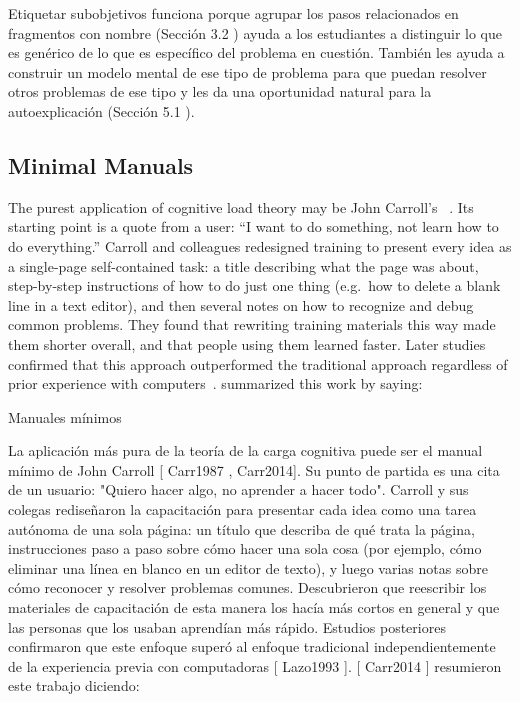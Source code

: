 Etiquetar subobjetivos funciona porque agrupar los pasos relacionados en fragmentos con nombre (Sección  3.2 ) ayuda a los estudiantes a distinguir lo que es genérico de lo que es específico del problema en cuestión. También les ayuda a construir un modelo mental de ese tipo de problema para que puedan resolver otros problemas de ese tipo y les da una oportunidad natural para la autoexplicación (Sección  5.1 ).

\subsection*{Minimal Manuals}

The purest application of cognitive load theory may be John Carroll's
~\cite{Carr1987,Carr2014}.
Its starting point is a quote from a user:
``I want to do something, not learn how to do everything.''
Carroll and colleagues redesigned training to present every idea as a single-page self-contained task:
a title describing what the page was about,
step-by-step instructions of how to do just one thing
(e.g.\ how to delete a blank line in a text editor),
and then several notes on how to recognize and debug common problems.
They found that rewriting training materials this way made them shorter overall,
and that people using them learned faster.
Later studies confirmed that this approach outperformed the traditional approach
regardless of prior experience with computers~\cite{Lazo1993}.
\cite{Carr2014} summarized this work by saying:

Manuales mínimos

La aplicación más pura de la teoría de la carga cognitiva puede ser el manual mínimo de John Carroll  [ Carr1987 , Carr2014]. Su punto de partida es una cita de un usuario: "Quiero hacer algo, no aprender a hacer todo". Carroll y sus colegas rediseñaron la capacitación para presentar cada idea como una tarea autónoma de una sola página: un título que describa de qué trata la página, instrucciones paso a paso sobre cómo hacer una sola cosa (por ejemplo, cómo eliminar una línea en blanco en un editor de texto), y luego varias notas sobre cómo reconocer y resolver problemas comunes. Descubrieron que reescribir los materiales de capacitación de esta manera los hacía más cortos en general y que las personas que los usaban aprendían más rápido. Estudios posteriores confirmaron que este enfoque superó al enfoque tradicional independientemente de la experiencia previa con computadoras [ Lazo1993 ]. [ Carr2014 ] resumieron este trabajo diciendo:

